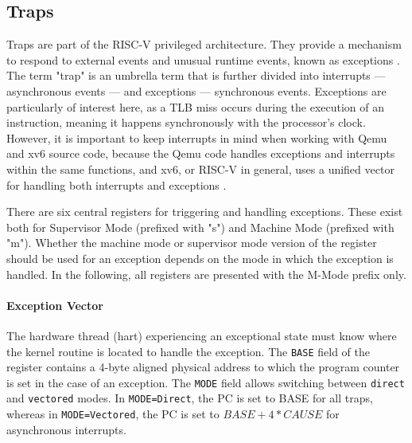 
\subsection{Traps}
Traps are part of the RISC-V privileged architecture. They provide a mechanism to respond to
external events and unusual runtime events, known as exceptions \cite{riscvreader}.
The term "trap" is an umbrella term that is further divided into interrupts — asynchronous events —
and exceptions — synchronous events.
Exceptions are particularly of interest here, as a TLB miss occurs during the execution of an instruction,
meaning it happens synchronously with the processor's clock. However, it is important to keep interrupts
in mind when working with Qemu and xv6 source code, because the Qemu code handles exceptions
and interrupts within the same functions, and xv6, or RISC-V in general, uses a unified
vector for handling both interrupts and exceptions \cite{RISCVInstructionSet}.

There are six central registers for triggering and handling exceptions. These exist both for
Supervisor Mode (prefixed with "s") and Machine Mode (prefixed with "m").
Whether the machine mode or supervisor mode version of the register should be used for an exception depends
on the mode in which the exception is handled. In the following, all registers are presented with the
M-Mode prefix only. 


\paragraph{Exception Vector} The hardware thread (hart)  experiencing
an exceptional state must know where the kernel routine is located to handle the exception.
The \texttt{BASE} field of the register contains a 4-byte aligned physical address to which
the program counter is set in the case of an exception.
The \texttt{MODE} field allows switching between \texttt{direct} and \texttt{vectored} modes.
In \texttt{MODE=Direct}, the PC is set to BASE for all traps, whereas in \texttt{MODE=Vectored},
the PC is set to $BASE+4*CAUSE$ for asynchronous interrupts.

